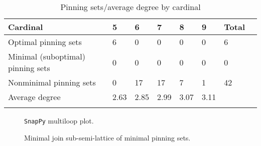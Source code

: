 \documentclass{article}%
\begin{document}
\begin{table}[ht]
	\caption{Pinning sets/average degree by cardinal}
	\centering
	\renewcommand{\arraystretch}{1.5}
	\begin{tabularx}{\textwidth}{lXXXXXXX}
		\toprule
			Cardinal & 5 & 6 & 7 & 8 & 9 & Total\\
			\hline
			Optimal pinning sets & 6 & 0 & 0 & 0 & 0 & 6 \\
			Minimal (suboptimal) pinning sets & 0 & 0 & 0 & 0 & 0 & 0 \\
			Nonminimal pinning sets & 0 & 17 & 17 & 7 & 1 & 42 \\
			Average degree & 2.63 & 2.85 & 2.99 & 3.07 & 3.11 &  \\
		\bottomrule \\ 
	\end{tabularx}
\end{table}

\begin{multicols}{2}
\begin{figure}[H]
\centering

\caption{\texttt{SnapPy} multiloop plot.}
\label{fig:tex/img/[[5, 14, 6, 1], [4, 11, 5, 12], [13, 10, 14, 11], [6, 10, 7, 9], [1, 9, 2, 8], [12, 3, 13, 4], [7, 3, 8, 2]].svg}
\end{figure}
\columnbreak

\begin{figure}[H]
\centering
\scalebox{0.8}{}
\caption{Minimal join sub-semi-lattice of minimal pinning sets.}
\label{fig:tex/img/[[5, 14, 6, 1], [4, 11, 5, 12], [13, 10, 14, 11], [6, 10, 7, 9], [1, 9, 2, 8], [12, 3, 13, 4], [7, 3, 8, 2]].pgf}
\end{figure}
\end{multicols}

\newpage
\end{document}
